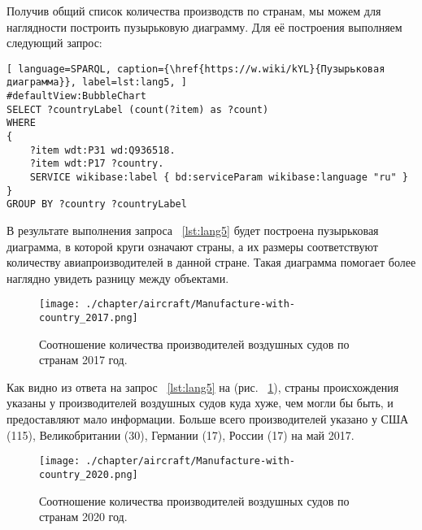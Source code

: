 
Получив общий список количества производств по странам, мы можем для наглядности построить пузырьковую диаграмму. Для её построения выполняем следующий запрос:

\begin{lstlisting}[ language=SPARQL, caption={\href{https://w.wiki/kYL}{Пузырьковая диаграмма}}, label=lst:lang5, ]
#defaultView:BubbleChart
SELECT ?countryLabel (count(?item) as ?count)
WHERE
{
    ?item wdt:P31 wd:Q936518.
  	?item wdt:P17 ?country.
    SERVICE wikibase:label { bd:serviceParam wikibase:language "ru" }
}
GROUP BY ?country ?countryLabel
\end{lstlisting}

В результате выполнения запроса ~\ref{lst:lang5} будет построена пузырьковая диаграмма, в которой круги означают страны, а их размеры соответствуют количеству авиапроизводителей в данной стране. Такая диаграмма помогает более наглядно увидеть разницу между объектами.
 
\begin{figure}[h!]
\centering
	\texttt{[image: ./chapter/aircraft/Manufacture-with-country\_2017.png]}
	\caption{Соотношение количества производителей воздушных судов по странам 2017 год.}
	\label{fig:Manufacture_with_country_2017}
\end{figure}

Как видно из ответа на запрос ~\ref{lst:lang5} на (рис. ~\ref{fig:Manufacture_with_country_2017}), страны происхождения указаны у производителей воздушных судов куда хуже, чем могли бы быть, и предоставляют мало информации. Больше всего производителей указано у США (115), Великобритании (30), Германии (17), России (17) на май 2017.

\begin{figure}[h!]
\centering
	\texttt{[image: ./chapter/aircraft/Manufacture-with-country\_2020.png]}
	\caption{Соотношение количества производителей воздушных судов по странам 2020 год.}
	\label{fig:Manufacture_with_country_2020}
\end{figure}

\label{aircraft_question_4}

